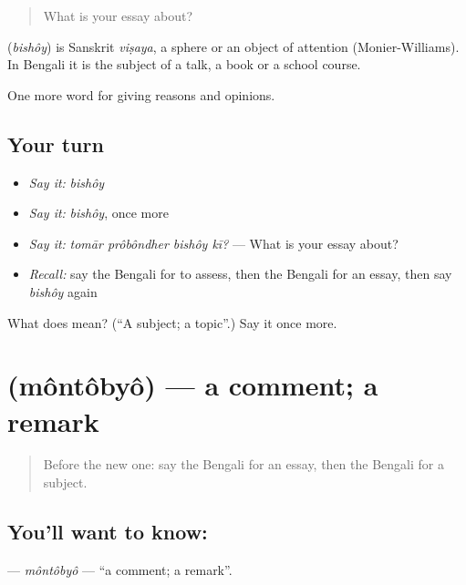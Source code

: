 \begin{quote}
What is your essay about?
\end{quote}

\begin{cousinweb}
\textbf{} (\emph{bishôy}) is Sanskrit \emph{viṣaya}, a sphere or an object of attention (Monier-Williams). In Bengali it is the subject of a talk, a book or a school course.
\end{cousinweb}

\begin{grammarlens}[title={What you've built}]
One more word for giving reasons and opinions.
\end{grammarlens}

\subsection*{Your turn}
\begin{itemize}
\raggedright
  \item \emph{Say it:} \emph{bishôy}
  \item \emph{Say it:} \emph{bishôy}, once more
  \item \emph{Say it:} \emph{tomār prôbôndher bishôy kī?} — What is your essay about?
  \item \emph{Recall:} say the Bengali for to assess, then the Bengali for an essay, then say \emph{bishôy} again
\end{itemize}

\begin{tcolorbox}[breakable,colback=teal!4,colframe=teal!35!black,title={Before you move on}]
What does  mean? (\textquotedblleft{}A subject; a topic\textquotedblright{}.) Say it once more.
\end{tcolorbox}
\section[\texorpdfstring{\bn{মন্তব্য} (môntôbyô)}{মন্তব্য (môntôbyô)}]{ (môntôbyô) — a comment; a remark}

\label{lesson:BN-C357-montobyo}



\begin{quote}
Before the new one: say the Bengali for an essay, then the Bengali for a subject.
\end{quote}

\subsection*{You'll want to know: }
\textbf{} — \emph{môntôbyô} — \textquotedblleft{}a comment; a remark\textquotedblright{}.

